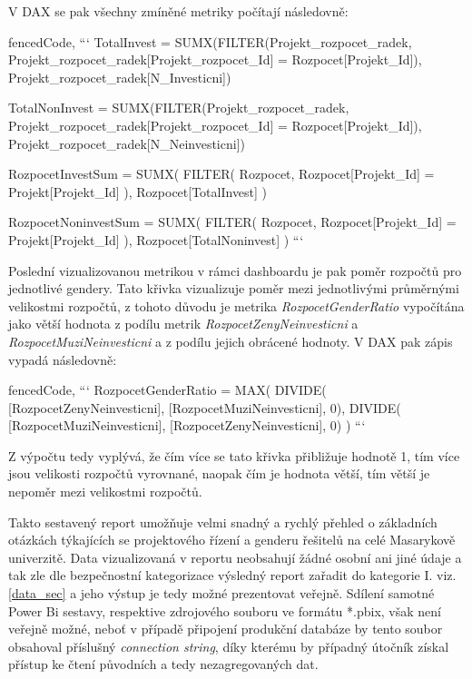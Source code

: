 \documentclass[
  digital,     %
  twoside,     %
  lof,         %
  lot,         %
]{fithesis4}
\begin{document}
V DAX se pak všechny zmíněné metriky počítají následovně:
\begin{markdown*}{%
  fencedCode,
}
```
TotalInvest = 
    SUMX(FILTER(Projekt_rozpocet_radek,
         Projekt_rozpocet_radek[Projekt_rozpocet_Id] = Rozpocet[Projekt_Id]),
    Projekt_rozpocet_radek[N_Investicni])

TotalNonInvest = 
    SUMX(FILTER(Projekt_rozpocet_radek,
         Projekt_rozpocet_radek[Projekt_rozpocet_Id] = Rozpocet[Projekt_Id]),
    Projekt_rozpocet_radek[N_Neinvesticni])


RozpocetInvestSum = 
    SUMX(
        FILTER(
            Rozpocet, Rozpocet[Projekt_Id] = Projekt[Projekt_Id]
            ),
        Rozpocet[TotalInvest]
    )

RozpocetNoninvestSum = 
    SUMX(
        FILTER(
            Rozpocet, Rozpocet[Projekt_Id] = Projekt[Projekt_Id]
            ),
        Rozpocet[TotalNoninvest]
    )
```
\end{markdown*}

Poslední vizualizovanou metrikou v rámci dashboardu je pak poměr rozpočtů pro jednotlivé gendery. Tato křivka vizualizuje poměr mezi jednotlivými průměrnými velikostmi rozpočtů, z tohoto důvodu  je metrika \emph{RozpocetGenderRatio} vypočítána jako větší hodnota z podílu metrik \emph{RozpocetZenyNeinvesticni} a \emph{RozpocetMuziNeinvesticni} a z podílu jejich obrácené hodnoty. V DAX pak zápis vypadá následovně: 

\begin{markdown*}{%
  fencedCode,
}
```
RozpocetGenderRatio = 
    MAX(
        DIVIDE(
            [RozpocetZenyNeinvesticni], [RozpocetMuziNeinvesticni], 0),
        DIVIDE(
            [RozpocetMuziNeinvesticni], [RozpocetZenyNeinvesticni], 0)
        )
```
\end{markdown*}

Z výpočtu tedy vyplývá, že čím více se tato křivka přibližuje hodnotě 1, tím více  jsou velikosti rozpočtů vyrovnané, naopak čím je hodnota větší, tím větší je nepoměr mezi velikostmi rozpočtů.

\vspace{5mm}
Takto sestavený report umožňuje velmi snadný a rychlý přehled o základních otázkách týkajících se projektového řízení a genderu řešitelů na celé Masarykově univerzitě. 
Data vizualizovaná v reportu neobsahují žádné osobní ani jiné údaje a tak zle dle bezpečnostní kategorizace výsledný report zařadit do kategorie I. viz. \ref{data_sec} a jeho výstup je tedy možné prezentovat veřejně. Sdílení samotné Power Bi sestavy, respektive zdrojového souboru ve formátu *.pbix, však není veřejně možné, neboť v případě připojení produkční databáze by tento soubor obsahoval příslušný \emph{connection string}, díky kterému by případný útočník získal přístup ke čtení původních a tedy nezagregovaných dat.
\end{document}
